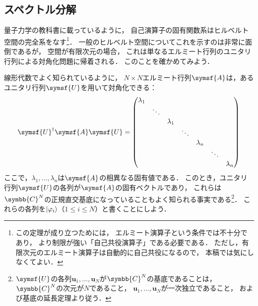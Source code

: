 \documentclass[
]{sotsu}
\begin{document}
\subsection{スペクトル分解}
\label{sec:spectrum-decomposition}

量子力学の教科書に載っているように，
自己演算子の固有関数系はヒルベルト空間の完全系をなす\footnote{
    この定理が成り立つためには，
    エルミート演算子という条件では不十分であり，
    より制限が強い「自己共役演算子」である必要である．
    ただし，有限次元のエルミート演算子は自動的に自己共役になるので，
    本稿では気にしなくてよい．
}．
一般のヒルベルト空間についてこれを示すのは非常に面倒であるが，
空間が有限次元の場合，
これは単なるエルミート行列のユニタリ行列による対角化問題に帰着される．
このことを確かめてみよう．

線形代数でよく知られているように，
$N \times N$エルミート行列$\symsf{A}$は，あるユニタリ行列$\symsf{U}$を用いて対角化できる：
\begin{equation}
    \label{eq:diagonalize-of-Hermitian}
    \adjoint{\symsf{U}} \symsf{A} \symsf{U}
        = 
        \begin{pmatrix}
            \lambda_1  \\
            & \ddots  \\
            & & \lambda_1  \\
            & & & \ddots  \\
            & & & & \lambda_n  \\
            & & & & & \ddots  \\
            & & & & & & \lambda_n
        \end{pmatrix}
\end{equation}
ここで，$\lambda_1, \dots, \lambda_n$は$\symsf{A}$の相異なる固有値である．
このとき，ユニタリ行列$\symsf{U}$の各列が$\symsf{A}$の固有ベクトルであり，
これらは$\symbb{C}^N$の正規直交基底になっていることもよく知られる事実である\footnote{
    $\symsf{U}$の各列$\symbf{u}_1, \dots, \symbf{u}_N$が$\symbb{C}^N$の基底であることは，
    $\symbb{C}^N$の次元が$N$であること，
    $\symbf{u}_1, \dots, \symbf{u}_N$が一次独立であること，
    および基底の延長定理より従う．
}．
これらの各列を$\ket{\varphi_i}$（$1 \leq i \leq N$）と書くことにしよう．
\end{document}
